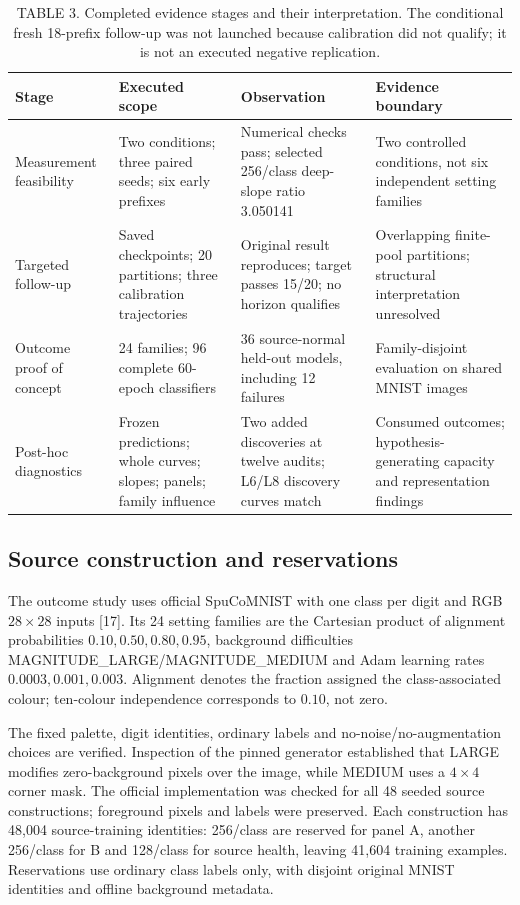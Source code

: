 \begin{table}[t]
\caption{TABLE 3. Completed evidence stages and their interpretation. The conditional fresh 18-prefix follow-up was not launched because calibration did not qualify; it is not an executed negative replication.}
\label{tab:stages}
\centering\small
\begin{tabular}{llll}
\toprule Stage & Executed scope & Observation & Evidence boundary\\\midrule
Measurement feasibility & Two conditions; three paired seeds; six early prefixes & Numerical checks pass; selected 256/class deep-slope ratio 3.050141 & Two controlled conditions, not six independent setting families\\
Targeted follow-up & Saved checkpoints; 20 partitions; three calibration trajectories & Original result reproduces; target passes 15/20; no horizon qualifies & Overlapping finite-pool partitions; structural interpretation unresolved\\
Outcome proof of concept & 24 families; 96 complete 60-epoch classifiers & 36 source-normal held-out models, including 12 failures & Family-disjoint evaluation on shared MNIST images\\
Post-hoc diagnostics & Frozen predictions; whole curves; slopes; panels; family influence & Two added discoveries at twelve audits; L6/L8 discovery curves match & Consumed outcomes; hypothesis-generating capacity and representation findings\\\bottomrule
\end{tabular}
\end{table}

\subsection{Source construction and reservations}
The outcome study uses official SpuCoMNIST with one class per digit and RGB $28\times28$ inputs [17]. Its 24 setting families are the Cartesian product of alignment probabilities $0.10,0.50,0.80,0.95$, background difficulties MAGNITUDE\_LARGE/MAGNITUDE\_MEDIUM and Adam learning rates $0.0003,0.001,0.003$. Alignment denotes the fraction assigned the class-associated colour; ten-colour independence corresponds to $0.10$, not zero.

The fixed palette, digit identities, ordinary labels and no-noise/no-augmentation choices are verified. Inspection of the pinned generator established that LARGE modifies zero-background pixels over the image, while MEDIUM uses a $4\times4$ corner mask. The official implementation was checked for all 48 seeded source constructions; foreground pixels and labels were preserved. Each construction has 48,004 source-training identities: 256/class are reserved for panel A, another 256/class for B and 128/class for source health, leaving 41,604 training examples. Reservations use ordinary class labels only, with disjoint original MNIST identities and offline background metadata.

